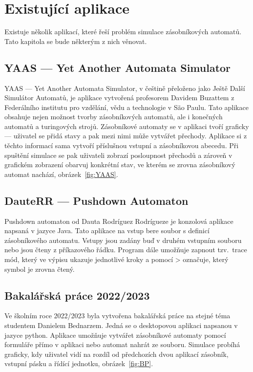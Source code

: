 \chapter{Existující aplikace}\label{chap:ExistingApps}

Existuje několik aplikací, které řeší problém simulace zásobníkových automatů. Tato kapitola se bude některým z nich věnovat.

\section{YAAS --- Yet Another Automata Simulator}

YAAS --- Yet Another Automata Simulator, v češtině přeloženo jako Ještě Další Simulátor Automatů, je aplikace vytvořená profesorem Davidem Buzattem z Federálního institutu pro vzdělání, vědu a technologie v São Paulu. Tato aplikace obsahuje nejen možnost tvorby zásobníkových automatů, ale i konečných automatů a turingových strojů. Zásobníkové automaty se v aplikaci tvoří graficky --- uživatel se přidá stavy a pak mezi nimi může vytvářet přechody. Aplikace si z těchto informací sama vytvoří příslušnou vstupní a zásobníkovou abecedu. Při spuštění simulace se pak uživateli zobrazí posloupnost přechodů a zároveň v grafickém zobrazení obarvuj konkrétní stav, ve kterém se zrovna zásobníkový automat nachází, obrázek~\ref{fig:YAAS}.\cite{Buzatto2023}

\section{DauteRR --- Pushdown Automaton}

Pushdown automaton od Dauta Rodríguez Rodrígueze je konzolová aplikace napsaná v jazyce Java. Tato aplikace na vstup bere soubor s definicí zásobníkového automatu. Vstupy jsou zadány buď v druhém vstupním souboru nebo jsou čteny z příkazového řádku. Program dále umožňuje zapnout tzv.~trace mód, který ve výpisu ukazuje jednotlivé kroky a pomocí > označuje, který symbol je zrovna čtený.\cite{Rodriguez2018}

\section{Bakalářská práce 2022/2023}

Ve školním roce 2022/2023 byla vytvořena bakalářská práce na stejné téma studentem Danielem Bednarzem. Jedná se o desktopovou aplikaci napsanou v jazyce python. Aplikace umožňuje vytvářet zásobníkové automaty pomocí formuláře přímo v aplikaci nebo automat nahrát ze souboru. Simulace probíhá graficky, kdy uživatel vidí na rozdíl od předchozích dvou aplikací zásobník, vstupní pásku a řídící jednotku, obrázek~\ref{fig:BP}.\cite{Bednarz2023}

